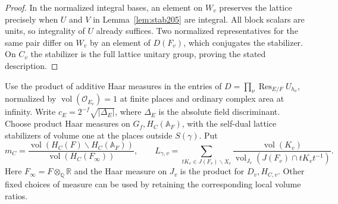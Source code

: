 \documentclass[a4paper,11pt]{article}
\theoremstyle{definition}
\theoremstyle{remark}
\newcommand{\RR}{\mathbb R}\newcommand{\CC}{\mathbb C}\newcommand{\QQ}{\mathbb Q}
\numberwithin{equation}{section}
\begin{document}
\begin{proof}
In the normalized integral bases, an element on \(W_v\) preserves
the lattice precisely when \(U\) and \(V\) in Lemma~\ref{lem:stab205}
are integral. All block scalars are units, so integrality of \(U\)
already suffices. Two normalized representatives for the same pair
differ on \(W_v\) by an element of \(D(F_v)\), which conjugates the
stabilizer. On \(C_v\) the stabilizer is the full lattice unitary
group, proving the stated description.
\end{proof}

Use the product of additive Haar measures in the entries of
\(D=\prod_\nu \operatorname{Res}_{E/F}U_{h_\nu}\), normalized by
\(\operatorname{vol}(\mathcal O_{E_v})=1\) at finite places and
ordinary complex area at infinity. Write \(c_E=2^{-f}\sqrt{|\Delta_E|}\),
where \(\Delta_E\) is the absolute field discriminant. Choose
product Haar measures on \(G_f,H_C(\mathbb A_F)\), with the
self-dual lattice stabilizers of volume one at the places outside
\(S(\gamma)\). Put
\[
 m_C=\frac{\operatorname{vol}(H_C(F)\backslash H_C(\mathbb A_F))}
                 {\operatorname{vol}(H_C(F_\infty))},\qquad
 L_{\gamma,v}
  =\sum_{tK_v\in J(F_v)\backslash X_v}
    \frac{\operatorname{vol}(K_v)}
         {\operatorname{vol}_{J_v}(J(F_v)\cap tK_vt^{-1})} .
\]
Here \(F_\infty=F\otimes_{\QQ}\RR\) and the Haar measure on \(J_v\)
is the product for \(D_v,H_{C,v}\). Other fixed choices of measure
can be used by retaining the corresponding local volume ratios.
\end{document}
